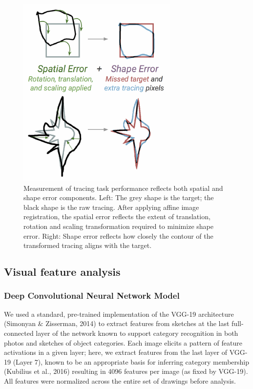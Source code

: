 \documentclass[10pt, letterpaper]{article}
\newenvironment{CodeChunk}{}{}
\begin{document}
\begin{CodeChunk}
\begin{figure}[H]

{\centering \includegraphics{figs/image-1} 

}

\caption[Measurement of tracing task performance reflects both spatial and shape error components]{Measurement of tracing task performance reflects both spatial and shape error components. Left: The grey shape is the target; the black shape is the raw tracing. After applying affine image registration, the spatial error reflects the extent of translation, rotation and scaling transformation required to minimize shape error. Right: Shape error reflects how closely the contour of the transformed tracing aligns with the target.}\label{fig:image}
\end{figure}
\end{CodeChunk}

\subsection{Visual feature analysis}\label{visual-feature-analysis}

\subsubsection{Deep Convolutional Neural Network
Model}\label{deep-convolutional-neural-network-model}

We used a standard, pre-trained implementation of the VGG-19
architecture (Simonyan \& Zisserman, 2014) to extract features from
sketches at the last full-connected layer of the network known to
support category recognition in both photos and sketches of object
categories. Each image elicits a pattern of feature activations in a
given layer; here, we extract features from the last layer of VGG-19
(Layer 7), known to be an appropriate basis for inferring category
membership (Kubilius et al., 2016) resulting in 4096 features per image
(as fixed by VGG-19). All features were normalized across the entire set
of drawings before analysis.
\end{document}
